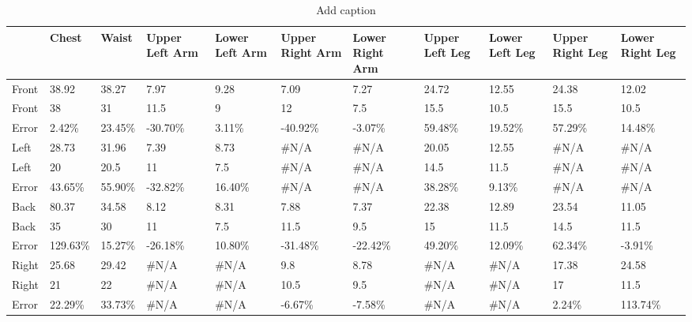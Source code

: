 \begin{table}[htbp]
	\centering
	\caption{Add caption}
	\begin{tabularx}{\textwidth}{|X|X|X|X|X|X|X|X|X|X|X|}
		\toprule
		& Chest & Waist & Upper Left Arm & Lower Left Arm & Upper Right Arm & Lower Right Arm & Upper Left Leg & Lower Left Leg & Upper Right Leg & Lower Right Leg \\
		\midrule
		\rowcolor[rgb]{ .573,  .816,  .314} Front & 38.92 & 38.27 & 7.97  & 9.28  & 7.09  & 7.27  & 24.72 & 12.55 & 24.38 & 12.02 \\
		\midrule
		\rowcolor[rgb]{ 0,  .69,  .941} Front & 38    & 31    & 11.5  & 9     & 12    & 7.5   & 15.5  & 10.5  & 15.5  & 10.5 \\
		\midrule
		Error & 2.42\% & 23.45\% & -30.70\% & 3.11\% & -40.92\% & -3.07\% & 59.48\% & 19.52\% & 57.29\% & 14.48\% \\
		\midrule
		\rowcolor[rgb]{ .573,  .816,  .314} Left  & 28.73 & 31.96 & 7.39  & 8.73  & \#N/A & \#N/A & 20.05 & 12.55 & \#N/A & \#N/A \\
		\midrule
		\rowcolor[rgb]{ 0,  .69,  .941} Left  & 20    & 20.5  & 11    & 7.5   & \#N/A & \#N/A & 14.5  & 11.5  & \#N/A & \#N/A \\
		\midrule
		Error & 43.65\% & 55.90\% & -32.82\% & 16.40\% & \#N/A & \#N/A & 38.28\% & 9.13\% & \#N/A & \#N/A \\
		\midrule
		\rowcolor[rgb]{ .573,  .816,  .314} Back  & 80.37 & 34.58 & 8.12  & 8.31  & 7.88  & 7.37  & 22.38 & 12.89 & 23.54 & 11.05 \\
		\midrule
		\rowcolor[rgb]{ 0,  .69,  .941} Back  & 35    & 30    & 11    & 7.5   & 11.5  & 9.5   & 15    & 11.5  & 14.5  & 11.5 \\
		\midrule
		Error & 129.63\% & 15.27\% & -26.18\% & 10.80\% & -31.48\% & -22.42\% & 49.20\% & 12.09\% & 62.34\% & -3.91\% \\
		\midrule
		\rowcolor[rgb]{ .573,  .816,  .314} Right & 25.68 & 29.42 & \#N/A & \#N/A & 9.8   & 8.78  & \#N/A & \#N/A & 17.38 & 24.58 \\
		\midrule
		\rowcolor[rgb]{ 0,  .69,  .941} Right & 21    & 22    & \#N/A & \#N/A & 10.5  & 9.5   & \#N/A & \#N/A & 17    & 11.5 \\
		\midrule
		Error & 22.29\% & 33.73\% & \#N/A & \#N/A & -6.67\% & -7.58\% & \#N/A & \#N/A & 2.24\% & 113.74\% \\
		\bottomrule
	\end{tabularx}%
	\label{tab:addlabel}%
\end{table}%
